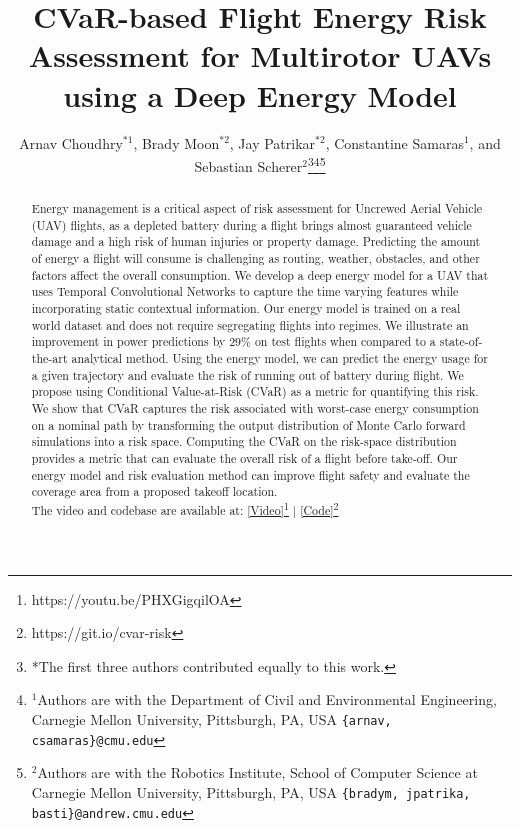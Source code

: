\documentclass[letterpaper, 10 pt, conference]{ieeeconf}
\title{\LARGE \bf
CVaR-based Flight Energy Risk Assessment for Multirotor UAVs using a Deep Energy Model
}
\author{ Arnav Choudhry$^{*1}$, Brady Moon$^{*2}$, Jay Patrikar$^{*2}$, Constantine Samaras$^{1}$, and Sebastian Scherer$^{2}$\thanks{*The first three authors contributed equally to this work.}\thanks{$^{1}$Authors are with the Department of Civil and Environmental Engineering, Carnegie Mellon University, Pittsburgh, PA, USA
        {\tt\small \{arnav, csamaras\}@cmu.edu}}\thanks{$^{2}$Authors are with the Robotics Institute, School of Computer Science at Carnegie Mellon University, Pittsburgh, PA, USA
{\tt\small  \{bradym, jpatrika, basti\}@andrew.cmu.edu}}}
\begin{document}
\maketitle
\thispagestyle{empty}
\pagestyle{empty}


\begin{abstract}

Energy management is a critical aspect of risk assessment for Uncrewed Aerial Vehicle (UAV) flights, as a depleted battery during a flight brings almost guaranteed vehicle damage and a high risk of human injuries or property damage. Predicting the amount of energy a flight will consume is challenging as routing, weather, obstacles, and other factors affect the overall consumption. We develop a deep energy model for a UAV that uses Temporal Convolutional Networks to capture the time varying features while incorporating static contextual information. Our energy model is trained on a real world dataset and does not require segregating flights into regimes. We illustrate an improvement in power predictions by $29\%$ on test flights when compared to a state-of-the-art analytical method. Using the energy model, we can predict the energy usage for a given trajectory and evaluate the risk of running out of battery during flight. We propose using Conditional Value-at-Risk (CVaR) as a metric for quantifying this risk. We show that CVaR captures the risk associated with worst-case energy consumption on a nominal path by transforming the output distribution of Monte Carlo forward simulations into a risk space. Computing the CVaR on the risk-space distribution provides a metric that can evaluate the overall risk of a flight before take-off. Our energy model and risk evaluation method can improve flight safety and evaluate the coverage area from a proposed takeoff location. \\
The video and codebase are available at: \href{https://youtu.be/PHXGigqilOA}{[Video]\footnote{\url{https://youtu.be/PHXGigqilOA}}} $\mid$ \href{https://git.io/cvar-risk}{[Code]\footnote{\url{https://git.io/cvar-risk}}}\\


\end{abstract}
\end{document}
